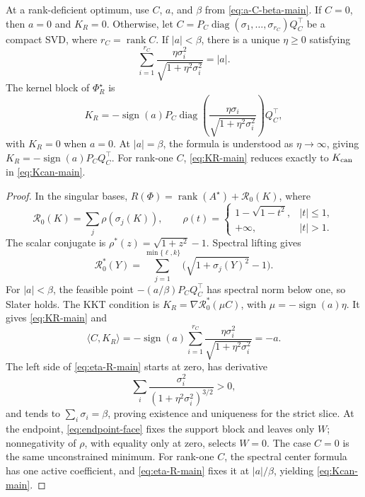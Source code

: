\begin{theorem}
\label{thm:general-fenchel-center}
At a rank-deficient optimum, use \(C\), \(a\), and \(\beta\) from
\eqref{eq:a-C-beta-main}.  If \(C=0\), then \(a=0\) and \(K_R=0\).
Otherwise, let
\(C=P_C\operatorname{diag}(\sigma_1,\ldots,\sigma_{r_C})Q_C^\top\) be a compact
SVD, where \(r_C=\operatorname{rank}C\).  If \(|a|<\beta\), there is a unique
\(\eta\ge0\) satisfying
\begin{equation}
 \sum_{i=1}^{r_C}
 \frac{\eta\sigma_i^2}{\sqrt{1+\eta^2\sigma_i^2}}=|a|.
 \label{eq:eta-R-main}
\end{equation}
The kernel block of \(\Phi_R^\star\) is
\begin{equation}
 K_R=-\operatorname{sign}(a)P_C
 \operatorname{diag}\left(
  \frac{\eta\sigma_i}{\sqrt{1+\eta^2\sigma_i^2}}
 \right)Q_C^\top,
 \label{eq:KR-main}
\end{equation}
with \(K_R=0\) when \(a=0\).  At \(|a|=\beta\), the formula is understood as
\(\eta\to\infty\), giving
\(K_R=-\operatorname{sign}(a)P_CQ_C^\top\).  For rank-one \(C\),
\eqref{eq:KR-main} reduces exactly to
\(K_{\rm can}\) in \eqref{eq:Kcan-main}.
\end{theorem}

\begin{proof}
In the singular bases,
\(R(\Phi)=\operatorname{rank}(A^\star)+\mathcal R_0(K)\), where
\[
 \mathcal R_0(K)=\sum_j\rho(\sigma_j(K)),
 \qquad
 \rho(t)=\begin{cases}1-\sqrt{1-t^2},&|t|\le1,\\
                         +\infty,&|t|>1.
          \end{cases}
\]
The scalar conjugate is \(\rho^*(z)=\sqrt{1+z^2}-1\).  Spectral lifting gives
\[
 \mathcal R_0^*(Y)=
 \sum_{j=1}^{\min\{\ell,k\}}
 \bigl(\sqrt{1+\sigma_j(Y)^2}-1\bigr).
\]
For \(|a|<\beta\), the feasible point
\(-(a/\beta)P_CQ_C^\top\) has spectral norm below one, so Slater holds.  The
KKT condition is
\(K_R=\nabla\mathcal R_0^*(\mu C)\), with
\(\mu=-\operatorname{sign}(a)\eta\).  It gives \eqref{eq:KR-main} and
\[
 \langle C,K_R\rangle
 =-\operatorname{sign}(a)\sum_{i=1}^{r_C}
 \frac{\eta\sigma_i^2}{\sqrt{1+\eta^2\sigma_i^2}}=-a.
\]
The left side
of \eqref{eq:eta-R-main} starts at zero, has derivative
\[
 \sum_i\frac{\sigma_i^2}{(1+\eta^2\sigma_i^2)^{3/2}}>0,
\]
and tends to \(\sum_i\sigma_i=\beta\), proving existence and uniqueness for
the strict slice.  At the endpoint, \eqref{eq:endpoint-face} fixes the support
block and leaves only \(W\); nonnegativity of \(\rho\), with equality only at
zero, selects \(W=0\).  The case \(C=0\) is the same unconstrained minimum.
For rank-one \(C\), the spectral center formula has one active coefficient,
and \eqref{eq:eta-R-main} fixes it at \(|a|/\beta\), yielding
\eqref{eq:Kcan-main}.
\end{proof}

